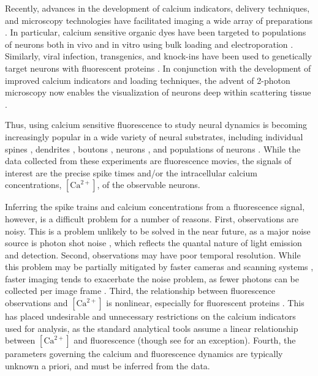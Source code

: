 \documentclass[10pt]{article}
\newcommand{\Ca}{[\text{Ca}^{2+}]}
\begin{document}
Recently, advances in the development of calcium indicators, delivery techniques, and microscopy technologies have facilitated imaging a wide array of preparations \cite{ImagingManual}. In particular,  calcium sensitive organic dyes \cite{Tsien81, YusteKatz91} have been targeted to populations of neurons both in vivo and in vitro using bulk loading  \cite{YusteKatz91, BrusteinKonnerth03, StosiekKonnerth03} and electroporation  \cite{NagayamaChen07, NevianHelmchen07}.  Similarly, viral infection, transgenics, and knock-ins have been used to genetically target neurons with fluorescent proteins \cite{MiyawakiTsien97, GriesbeckTsien01, NakaiImoto01%
} . In conjunction with the development of improved calcium indicators and loading techniques, the advent of 2-photon microscopy now enables the visualization of neurons deep within scattering tissue \cite{DenkWebb90, OheimCharpak01, TheerDenk03, FlusbergSchnitzer05a}.

Thus, using calcium sensitive fluorescence to study neural dynamics is becoming increasingly popular in a wide variety of neural substrates, including individual spines \cite{MullerConnor91, YusteDenk95, EngertBonhoeffer99, NimchinskySvoboda04}, dendrites \cite{MajewskaYuste00, ScheussSvoboda06, SdrullaLinden07}, boutons \cite{MajewskaSur06, BrenowitzRegehr07}, neurons \cite{HelmchenSakmann96, SvobodaDenk96, MaravallSvoboda00}, and populations of neurons \cite{YusteKatz91, O'MalleyFetcho96, SmettersYuste99, IkegayaYuste04, NiellSmith05, OhkiReid05, OhkiReid06, YaksiFriedrich07, NagayamaChen07, SatoSvoboda07, RootWang07}. While the data collected from these experiments are fluorescence movies, the signals of interest are the precise spike times and/or the intracellular calcium concentrations, $\Ca$, of the observable neurons.

Inferring the spike trains and calcium concentrations from a fluorescence signal, however, is a difficult problem for a number of reasons.  First, observations are noisy.  This is a problem unlikely to be solved in the near future, as a major noise source is photon shot noise \cite{SjulsonMiesenbock07}, which reflects the quantal nature of light emission and detection. Second, observations may have poor temporal resolution.  While this problem may be partially mitigated by faster cameras and scanning systems \cite{FlusbergSchnitzer05a,FanEllisman99, NguyenParker01, IyerSaggau06}, faster imaging tends to exacerbate the noise problem, as fewer photons can be collected per image frame \cite{SjulsonMiesenbock07}.  Third, the relationship between fluorescence observations and $\Ca$ is nonlinear, especially for fluorescent proteins \cite{PologrutoSvoboda04, TayYue07}.  This has placed undesirable and unnecessary restrictions on the calcium indicators used for analysis, as the standard analytical tools assume a linear relationship between $\Ca$ and fluorescence \cite{YasudaSvoboda04, ReiffBorst05, YaksiFriedrich06, SjulsonMiesenbock07} (though see \cite{BorstAbarbanel07} for an exception). Fourth, the parameters governing the calcium and fluorescence dynamics are typically unknown a priori, and must be inferred from the data.
\end{document}

